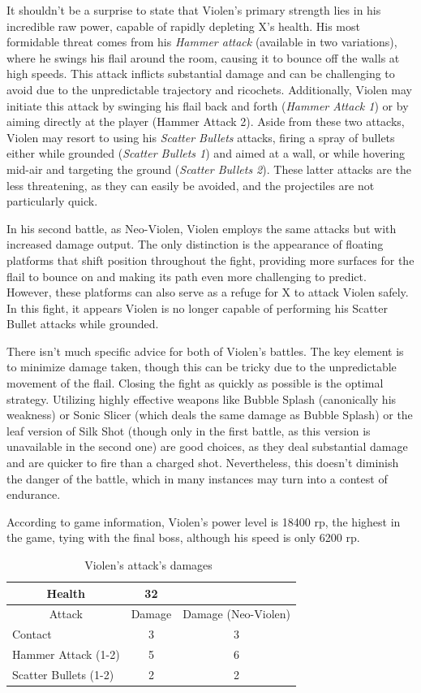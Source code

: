 It shouldn't be a surprise to state that Violen's primary strength lies in his incredible raw power, capable of rapidly depleting X's health. His most formidable threat comes from his \emph{Hammer attack} (available in two variations), where he swings his flail around the room, causing it to bounce off the walls at high speeds. This attack inflicts substantial damage and can be challenging to avoid due to the unpredictable trajectory and ricochets. Additionally, Violen may initiate this attack by swinging his flail back and forth (\emph{Hammer Attack 1}) or by aiming directly at the player (Hammer Attack 2). Aside from these two attacks, Violen may resort to using his \emph{Scatter Bullets} attacks, firing a spray of bullets either while grounded (\emph{Scatter Bullets 1}) and aimed at a wall, or while hovering mid-air and targeting the ground (\emph{Scatter Bullets 2}). These latter attacks are the less threatening, as they can easily be avoided, and the projectiles are not particularly quick.

In his second battle, as Neo-Violen, Violen employs the same attacks but with increased damage output. The only distinction is the appearance of floating platforms that shift position throughout the fight, providing more surfaces for the flail to bounce on and making its path even more challenging to predict. However, these platforms can also serve as a refuge for X to attack Violen safely. In this fight, it appears Violen is no longer capable of performing his Scatter Bullet attacks while grounded.

There isn't much specific advice for both of Violen's battles. The key element is to minimize damage taken, though this can be tricky due to the unpredictable movement of the flail. Closing the fight as quickly as possible is the optimal strategy. Utilizing highly effective weapons like Bubble Splash (canonically his weakness) or Sonic Slicer (which deals the same damage as Bubble Splash) or the leaf version of Silk Shot (though only in the first battle, as this version is unavailable in the second one) are good choices, as they deal substantial damage and are quicker to fire than a charged shot. Nevertheless, this doesn't diminish the danger of the battle, which in many instances may turn into a contest of endurance.

According to game information, Violen's power level is 18400 rp, the highest in the game, tying with the final boss, although his speed is only 6200 rp.
\begin{table}[htp]
	\centering
	\begin{tabular}[h]{l c c}
		\toprule
		\multicolumn{1}{c}{Health}  & 32 &\\
		\midrule
		\multicolumn{1}{c}{Attack} & \multicolumn{1}{c}{Damage}& \multicolumn{1}{c}{Damage (Neo-Violen)}\\
		Contact & 3 & 3\\
		Hammer Attack (1-2) & 5& 6\\
		Scatter Bullets (1-2) & 2& 2\\
		\bottomrule
	\end{tabular}
	\caption{Violen's attack's damages~\cite{wiki:Violen,book:Compendium}}
\end{table}

